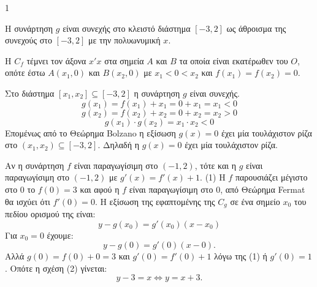 \begin{ylh}{1}
    \item [Ύλη από εικόνα]
\end{ylh}
\begin{alist}
\item [$\alpha$)]
    \begin{rlist}
    \item Η συνάρτηση $g$ είναι συνεχής στο κλειστό διάστημα $[-3,2]$ ως άθροισμα της συνεχούς στο $[-3,2]$ με την πολυωνυμική $x$.
    \item Η $C_f$ τέμνει τον άξονα $x'x$ στα σημεία $A$ και $B$ τα οποία είναι εκατέρωθεν του $O$, οπότε έστω $A(x_1, 0)$ και $B(x_2, 0)$ με $x_1 < 0 < x_2$ και $f(x_1) = f(x_2) = 0$.
    \end{rlist}
    Στο διάστημα $[x_1, x_2] \subseteq [-3,2]$ η συνάρτηση $g$ είναι συνεχής.
    \[ g(x_1) = f(x_1) + x_1 = 0 + x_1 = x_1 < 0 \]
    \[ g(x_2) = f(x_2) + x_2 = 0 + x_2 = x_2 > 0 \]
    \[ g(x_1) \cdot g(x_2) = x_1 \cdot x_2 < 0 \]
    Επομένως από το Θεώρημα Bolzano η εξίσωση $g(x) = 0$ έχει μία τουλάχιστον ρίζα στο $(x_1, x_2) \subseteq [-3,2]$. Δηλαδή η $g(x) = 0$ έχει μία τουλάχιστον ρίζα.
\item [$\beta$)]
    Αν η συνάρτηση $f$ είναι παραγωγίσιμη στο $(-1,2)$, τότε και η $g$ είναι παραγωγίσιμη στο $(-1,2)$ με $g'(x) = f'(x) + 1$. (1)
    Η $f$ παρουσιάζει μέγιστο στο $0$ το $f(0) = 3$ και αφού η $f$ είναι παραγωγίσιμη στο $0$, από Θεώρημα Fermat θα ισχύει ότι $f'(0) = 0$.
    Η εξίσωση της εφαπτομένης της $C_g$ σε ένα σημείο $x_0$ του πεδίου ορισμού της είναι:
    \[ y - g(x_0) = g'(x_0)(x - x_0) \]
    Για $x_0 = 0$ έχουμε:
    \[ y - g(0) = g'(0)(x - 0). \tag{2} \]
    Αλλά $g(0) = f(0) + 0 = 3$ και $g'(0) = f'(0) + 1$ λόγω της (1) ή $g'(0) = 1$.
    Οπότε η σχέση (2) γίνεται:
    \[ y - 3 = x \Leftrightarrow y = x + 3. \]
\end{alist}